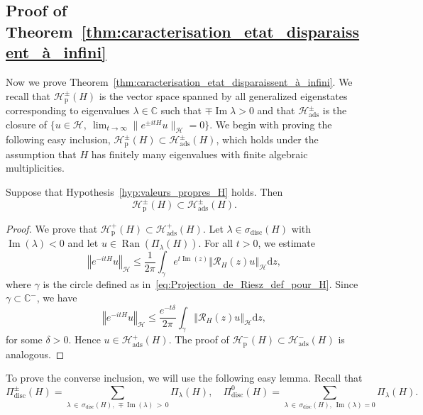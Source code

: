 \documentclass[AHL,Unicode,longabstracts,published]{cedram}
\newcommand{\Hi}{\mathcal{H}}
\newcommand{\bbC}{\mathbb{C}}
\newcommand{\rmp}{\mathrm{p}}
\newcommand{\ads}{\mathrm{ads}}
\newcommand{\rmd}{\mathrm{d}}
\newcommand{\disc}{\mathrm{disc}}
\newcommand{\norme}[1]{\left\Vert #1\right\Vert}
\newcommand{\Res}{\mathcal{R}}
\DeclareMathOperator{\Ran}{Ran}
\DeclareMathOperator{\im}{Im}
\newcommand*\bbC{\mathbb{C}}
\newcommand{\Hi}{\mathcal{H}}
\newcommand{\rmp}{\mathrm{p}}
\DeclareMathOperator{\im}{Im}
\begin{document}
\subsection{Proof of Theorem~\ref{thm:caracterisation_etat_disparaissent_à_infini}}\label{subsec:ads}

Now we prove Theorem~\ref{thm:caracterisation_etat_disparaissent_à_infini}. We recall that $\Hi_\rmp^\pm(H)$ is the vector space spanned by all generalized eigenstates corresponding to eigenvalues $\lambda\in\bbC$ such that $\mp\im\lambda >0$ and that $\Hi_\ads^\pm$ is the closure of $\{ u\in\Hi,~\lim_{t\rightarrow \infty}\|e^{\pm itH}u\|_\Hi=0\}$. We begin with proving the following easy inclusion, $\Hi_\rmp^\pm(H)\subset\Hi_\ads^\pm(H)$, which holds under the assumption that $H$ has finitely many eigenvalues with finite algebraic multiplicities.


\begin{prop}\label{prop:easy_incl}
Suppose that Hypothesis~\ref{hyp:valeurs_propres_H} holds. Then
\begin{equation*}
\Hi_\rmp^\pm(H)\subset\Hi_\ads^\pm(H).
\end{equation*}
\end{prop}

\begin{proof}
We prove that $\Hi_\rmp^+(H)\subset\Hi_{\ads}^+(H)$. Let $\lambda\in\sigma_{\disc}(H)$ with $\im(\lambda)<0$ and let $u\in\Ran(\Pi_\lambda(H))$. For all $t>0$, we estimate
\begin{equation*}
\norme{e^{-itH}u}_\Hi\leq\frac{1}{2\pi}\int_\gamma e^{t\im(z)}\norme{\Res_H(z)u}_\Hi \rmd z,
\end{equation*}
where $\gamma$ is the circle defined as in~\eqref{eq:Projection_de_Riesz_def_pour_H}. Since $\gamma\subset\bbC^-$, we have
\begin{equation*}
\norme{e^{-itH}u}_\Hi\leq\frac{e^{-t\delta}}{2\pi} \int_\gamma \norme{\Res_H(z)u}_\Hi \rmd z,
\end{equation*}
for some $\delta>0$. Hence $u\in\Hi_{\ads}^+(H)$. The proof of $\Hi_\rmp^-(H)\subset\Hi_{\ads}^-(H)$ is analogous.
\end{proof}

To prove the converse inclusion, we will use the following easy lemma. Recall that
\begin{equation*}
\Pi^\pm_{\disc}(H)=\sum_{\lambda\,\in\,\sigma_{\disc}(H),\,\mp\im(\lambda)\,>\,0}\Pi_\lambda(H), \quad \Pi^0_{\disc}(H)=\sum_{\lambda\,\in\,\sigma_{\disc}(H),\,\im(\lambda)=0}\Pi_\lambda(H).
\end{equation*}
\end{document}
